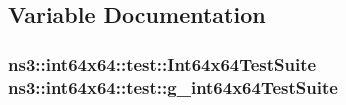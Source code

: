\subsection{Variable Documentation}
\subsubsection[{\texorpdfstring{g\+\_\+int64x64\+Test\+Suite}{g_int64x64TestSuite}}]{\setlength{\rightskip}{0pt plus 5cm} {\bf ns3\+::int64x64\+::test\+::\+Int64x64\+Test\+Suite}   ns3\+::int64x64\+::test\+::g\+\_\+int64x64\+Test\+Suite\hspace{0.3cm}{\ttfamily [static]}}\hypertarget{namespacens3_1_1int64x64_1_1test_a1d1e87d28622f2b6430e749acaf43e13}{}\label{namespacens3_1_1int64x64_1_1test_a1d1e87d28622f2b6430e749acaf43e13}
